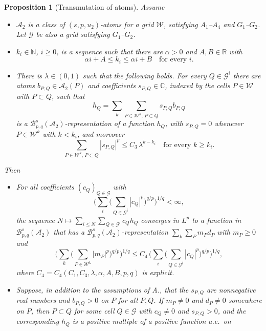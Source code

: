 \documentclass[11pt]{amsart}
\newtheorem{proposition}[theorem]{Proposition}
\theoremstyle{definition}
\begin{document}
\begin{proposition}[Transmutation of atoms]\label{trans}
Assume
\begin{itemize}
\item[{\bf I.}] $\mathcal{A}_2$ is a class of $(s,p,u_2)$-atoms for a grid
$\mathcal{W}$, satisfying $A_1$--$A_4$ and $G_1$--$G_2$. Let $\mathcal{G}$ be
also a grid satisfying $G_1$--$G_2$.
\item[{\bf II.}] $k_i\in \mathbb{N}$, $i\geq 0$, is a sequence such that there
are $\alpha>0$ and $A,B\in \mathbb{R}$ with
$$ \alpha i +A \leq k_i\leq \alpha i +B \quad\text{for every } i.$$
\item[{\bf III.}] There is $\lambda \in(0,1)$ such that the following holds.
For every $Q\in \mathcal{G}^i$ there are atoms $b_{P,Q} \in \mathcal{A}_2(P)$
and coefficients $s_{P,Q}\in \mathbb{C}$, indexed by the cells
$P \in \mathcal{W}$ with $P\subset Q$, such that
$$h_Q=\sum_k \sum_{P\in \mathcal{W}^k,\, P\subset Q} s_{P,Q} b_{P,Q}$$
is a $\mathcal{B}^s_{p,q}(\mathcal{A}_2)$-representation of a function $h_Q$,
with $s_{P,Q}=0$ whenever $P \in \mathcal{W}^k$ with $k < k_i$, and moreover
\begin{equation}\label{ad} \sum_{P\in \mathcal{W}^k,\, P \subset Q} |s_{P,Q}|^p \leq C_3\, \lambda^{k-k_i}
\quad\text{for every } k\geq k_i.\end{equation}
\end{itemize}
Then
\begin{itemize}
\item[{\bf A.}] For all coefficients $(c_Q)_{Q\in \mathcal{G}}$ with
$$\big( \sum_i \big( \sum_{Q\in \mathcal{G}^i} |c_{Q}|^p \big)^{q/p}\big)^{1/q}<\infty,$$
the sequence $N\mapsto \sum_{i\leq N} \sum_{Q\in \mathcal{G}^i }c_Q h_Q$
converges in $L^p$ to a function in $\mathcal{B}^s_{p,q}(\mathcal{A}_2)$ that
has a $\mathcal{B}^s_{p,q}(\mathcal{A}_2)$-representation
$\sum_k \sum_{P}m_P d_P$ with $m_P \geq 0$ and
$$\big(\sum_k \big( \sum_{P \in \mathcal{W}^k} |m_{P}|^p \big)^{q/p}\big)^{1/q}
\leq C_4\, \big( \sum_i \big( \sum_{Q\in \mathcal{G}^i} |c_{Q}|^p \big)^{q/p}\big)^{1/q},$$
where $C_4=C_4(C_1,C_3,\lambda,\alpha,A,B,p,q)$ is
explicit.
\item[{\bf B.}] Suppose, in addition to the assumptions of A., that the
$s_{P,Q}$ are nonnegative real numbers and $b_{P,Q}>0$ on $P$ for all $P,Q$.
If $m_P\neq 0$ and $d_P \neq 0$ somewhere on $P$, then $P\subset Q$ for some
cell $Q \in \mathcal{G}$ with $c_Q \neq 0$ and $s_{P,Q}>0$, and the
corresponding $h_Q$ is a positive multiple of a positive function a.e.\ on

\end{itemize}
\end{proposition}
\end{document}
